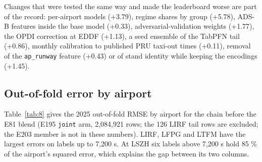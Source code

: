 \documentclass[11pt,a4paper]{article}
\begin{document}
Changes that were tested the same way and made the leaderboard worse are part of the record: per-airport models (+3.79), regime shares by group (+5.78), ADS-B features inside the base model (+0.33), adversarial-validation weights (+1.77), the OPDI correction at EDDF (+1.13), a seed ensemble of the TabPFN tail (+0.86), monthly calibration to published PRU taxi-out times (+0.11), removal of the \texttt{ap\_\allowbreak{}runway} feature (+0.43) or of stand identity while keeping the encodings (+1.45).

\subsection{Out-of-fold error by airport}\label{out-of-fold-error-by-airport}

Table~\ref{tab:8} gives the 2025 out-of-fold RMSE by airport for the chain before the E81 blend (E195 \texttt{joint} arm, 2,084,921 rows; the 126 LIRF tail rows are excluded; the E203 member is not in these numbers). LIRF, LFPG and LTFM have the largest errors on labels up to 7,200 s. At LSZH six labels above 7,200 s hold 85 \% of the airport's squared error, which explains the gap between its two columns.
\end{document}
